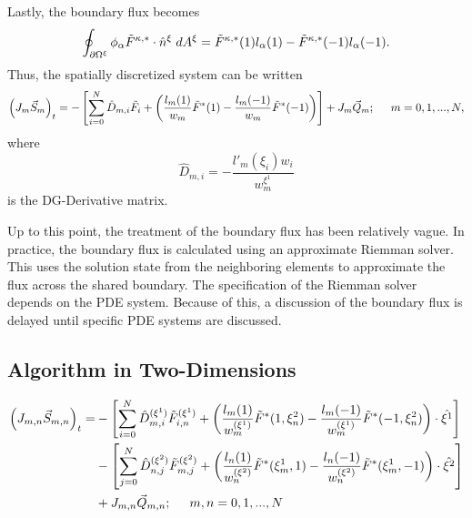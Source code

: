 \documentclass[12pt]{softwaremanual}
\begin{document}
Lastly, the boundary flux becomes
\begin{equation}
\oint_{\partial \Omega^\xi} \phi_{\alpha}  \tilde{F}^{\kappa,*}  \cdot \hat{n}^\xi \hspace{1mm} d A^\xi = \tilde{F}^{\kappa,*}(1)l_\alpha(1) - \tilde{F}^{\kappa,*}(-1)l_\alpha(-1). 
\end{equation}
Thus, the spatially discretized system can be written
\begin{equation}
 \left( J_{m} \vec{S}_{m} \right)_t =  -\left[\sum_{i=0}^{N}\hat{D}_{m,i} \tilde{F}_{i}   + \left( \frac{ l_m(1)}{w_m} \tilde{F}^{*}(1) - \frac{ l_m(-1)}{w_m} \tilde{F}^{*}(-1) \right) \right] + J_{m}\vec{Q}_{m}; \hspace{5mm} m=0,1,...,N, \label{eq:discrete1d_system} 
\end{equation}
where
\begin{equation}
 \hat{D}_{m,i} = -\frac{l'_m(\xi_i)w_i}{w^{\xi^1}_m}
\end{equation}
is the DG-Derivative matrix. 

Up to this point, the treatment of the boundary flux has been relatively vague. In practice, the boundary flux is calculated using an approximate Riemman solver. This uses the solution state from the neighboring elements to approximate the flux across the shared boundary. The specification of the Riemman solver depends on the PDE system. Because of this, a discussion of the boundary flux is delayed until specific PDE systems are discussed.


\subsection{Algorithm in Two-Dimensions}\label{sec:DGSEM_2D}

 \begin{equation}
 \begin{split}
 \left( J_{m,n} \vec{S}_{m,n} \right)_t =  &-\left[\sum_{i=0}^{N}\hat{D}^{(\xi^1)}_{m,i} \tilde{F}^{(\xi^1)}_{i,n}   + \left( \frac{ l_m(1)}{w^{(\xi^1)}_m} \tilde{F}^{*}(1,\xi^2_n) - \frac{ l_m(-1)}{w^{(\xi^1)}_m} \tilde{F}^{*}(-1,\xi^2_n) \right) \cdot \hat{\xi^1} \right] \\
  &-\left[ \sum_{j=0}^{N}\hat{D}^{(\xi^2)}_{n,j} \tilde{F}^{(\xi^2)}_{m,j}  + \left( \frac{l_n(1)}{w^{(\xi^2)}_n} \tilde{F}^{*}(\xi^1_m,1)  -  \frac{l_n(-1)}{w^{(\xi^2)}_n} \tilde{F}^{*}(\xi^1_m,-1) \right)\cdot \hat{\xi^2}  \right] \\ 
 &+ J_{m,n}\vec{Q}_{m,n}; \hspace{5mm} m,n=0,1,...,N
\end{split} \label{eq:discrete2d_system} 
 \end{equation}
\end{document}
